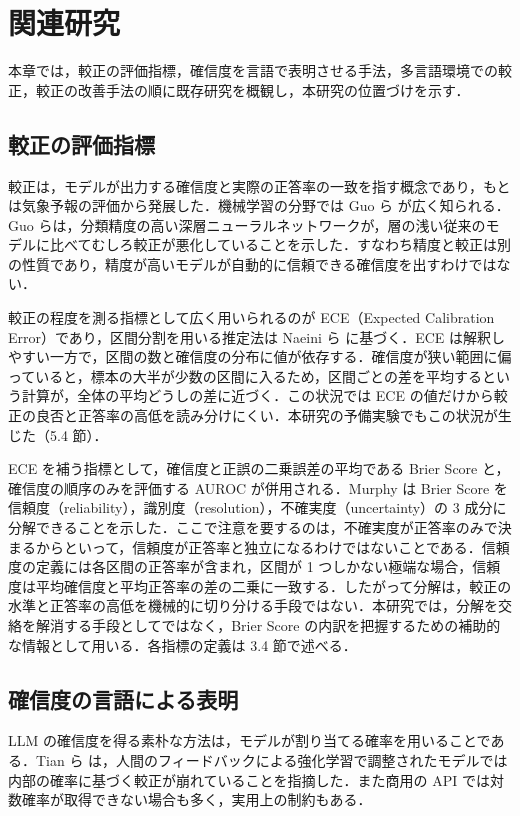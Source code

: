 \chapter{関連研究}

本章では，較正の評価指標，確信度を言語で表明させる手法，多言語環境での較正，較正の改善手法の順に既存研究を概観し，本研究の位置づけを示す．

\section{較正の評価指標}

較正は，モデルが出力する確信度と実際の正答率の一致を指す概念であり，もとは気象予報の評価から発展した．機械学習の分野では Guo ら \cite{guo2017calibration} が広く知られる．Guo らは，分類精度の高い深層ニューラルネットワークが，層の浅い従来のモデルに比べてむしろ較正が悪化していることを示した．すなわち精度と較正は別の性質であり，精度が高いモデルが自動的に信頼できる確信度を出すわけではない．

較正の程度を測る指標として広く用いられるのが ECE（Expected Calibration Error）であり，区間分割を用いる推定法は Naeini ら \cite{naeini2015binning} に基づく．ECE は解釈しやすい一方で，区間の数と確信度の分布に値が依存する．確信度が狭い範囲に偏っていると，標本の大半が少数の区間に入るため，区間ごとの差を平均するという計算が，全体の平均どうしの差に近づく．この状況では ECE の値だけから較正の良否と正答率の高低を読み分けにくい．本研究の予備実験でもこの状況が生じた（5.4 節）．

ECE を補う指標として，確信度と正誤の二乗誤差の平均である Brier Score と，確信度の順序のみを評価する AUROC が併用される．Murphy \cite{murphy1973partition} は Brier Score を信頼度（reliability），識別度（resolution），不確実度（uncertainty）の 3 成分に分解できることを示した．ここで注意を要するのは，不確実度が正答率のみで決まるからといって，信頼度が正答率と独立になるわけではないことである．信頼度の定義には各区間の正答率が含まれ，区間が 1 つしかない極端な場合，信頼度は平均確信度と平均正答率の差の二乗に一致する．したがって分解は，較正の水準と正答率の高低を機械的に切り分ける手段ではない．本研究では，分解を交絡を解消する手段としてではなく，Brier Score の内訳を把握するための補助的な情報として用いる．各指標の定義は 3.4 節で述べる．

\section{確信度の言語による表明}

LLM の確信度を得る素朴な方法は，モデルが割り当てる確率を用いることである．Tian ら \cite{tian2023justask} は，人間のフィードバックによる強化学習で調整されたモデルでは内部の確率に基づく較正が崩れていることを指摘した．また商用の API では対数確率が取得できない場合も多く，実用上の制約もある．

